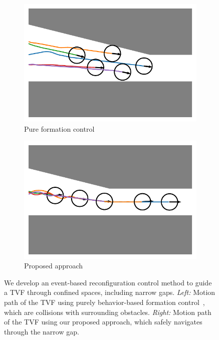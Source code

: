 \begin{figure}
\centering
\begin{subfigure}[b]{0.4\textwidth}
    
    \centering
    \includegraphics[width=\linewidth]{paper2/images/sample_bc.pdf}
    \caption{Pure formation control}
    \label{fig:1sample_bc}
\end{subfigure}
\begin{subfigure}[b]{0.4\textwidth}
    \centering
    \includegraphics[width=\linewidth]{paper2/images/sample_edc.pdf}
    \caption{Proposed approach}
    \label{fig:1sample_edc}
\end{subfigure}
\caption{We develop an event-based reconfiguration control method to guide a TVF through confined spaces, including narrow gaps. \textit{Left:} Motion path of the TVF using purely behavior-based formation control~\cite{736776, Vsrhelyi2018}, which are collisions with surrounding obstacles. \textit{Right:} Motion path of the TVF using our proposed approach, which safely navigates through the narrow gap.}
\label{fig:1sample}
\end{figure}

